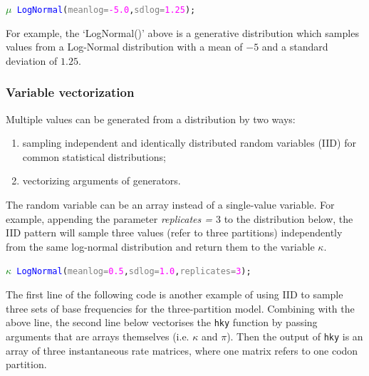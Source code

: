\documentclass[10pt,letterpaper,table]{article}
\begin{document}
{\small
\begin{alltt}
    \textcolor{green}{\(\mu\)} ~ \textcolor{blue}{LogNormal}(\textcolor{gray}{meanlog=}\textcolor{magenta}{-5.0}, \textcolor{gray}{sdlog=}\textcolor{magenta}{1.25});
\end{alltt}

For example, the `LogNormal()' above is a generative distribution which samples values from a Log-Normal distribution with a mean of $-5$ and a standard deviation of $1.25$. 
}


\subsubsection{Variable vectorization}

Multiple values can be generated from a distribution by two ways:

\begin{enumerate}
    \item sampling independent and identically distributed random variables (IID) for common statistical distributions;
    \item vectorizing arguments of generators.
\end{enumerate}

The random variable can be an array instead of a single-value variable. For example, appending the parameter \textit{replicates = $3$} to the distribution below, the IID pattern will sample three values (refer to three partitions) independently from the same log-normal distribution and return them to the variable $\kappa$.

{\small
\begin{alltt}
    \textcolor{green}{\(\kappa\)} ~ \textcolor{blue}{LogNormal}(\textcolor{gray}{meanlog=}\textcolor{magenta}{0.5}, \textcolor{gray}{sdlog=}\textcolor{magenta}{1.0}, \textcolor{gray}{replicates=}\textcolor{magenta}{3});
\end{alltt}
}

The first line of the following code is another example of using IID to sample three sets of base frequencies for the three-partition model. 
Combining with the above line, the second line below vectorises the \texttt{hky} function by passing arguments that are arrays themselves (i.e. \texttt{$\kappa$} and \texttt{$\pi$}).
Then the output of \texttt{hky} is an array of three instantaneous rate matrices, where one matrix refers to one codon partition.
\end{document}
